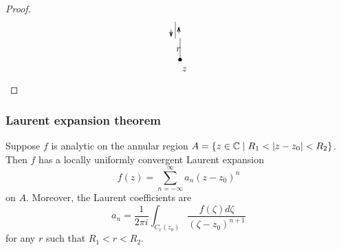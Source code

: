 \documentclass[12pt]{article}
\begin{document}
\begin{proof}
\[\begin{tikzpicture}[x=0.75pt,y=0.75pt,yscale=-.6,xscale=.6]
        \draw    (263.02,62.83) -- (263.02,113.43) ;
        \draw [shift={(263.02,113.43)}, rotate = 90] [color={rgb, 255:red, 0; green, 0; blue, 0 }  ][fill={rgb, 255:red, 0; green, 0; blue, 0 }  ][line width=0.75]      (0, 0) circle [x radius= 3.35, y radius= 3.35]   ;
        \draw    (252,25) -- (252,64.26) ;
        \draw    (242,42.64) -- (242,57.64) ;
        \draw [shift={(242,59.64)}, rotate = 270] [color={rgb, 255:red, 0; green, 0; blue, 0 }  ][line width=0.75]    (10.93,-3.29) .. controls (6.95,-1.4) and (3.31,-0.3) .. (0,0) .. controls (3.31,0.3) and (6.95,1.4) .. (10.93,3.29)   ;
        \draw    (260,52.64) -- (260,39.64) ;
        \draw [shift={(260,37.64)}, rotate = 90] [color={rgb, 255:red, 0; green, 0; blue, 0 }  ][line width=0.75]    (10.93,-3.29) .. controls (6.95,-1.4) and (3.31,-0.3) .. (0,0) .. controls (3.31,0.3) and (6.95,1.4) .. (10.93,3.29)   ;
        
        \draw (265.21,129.09) node [anchor=north west][inner sep=0.75pt]    {$z$};
        \draw (251.95,82.47) node [anchor=north west][inner sep=0.75pt]    {$r$};
        
        
        \end{tikzpicture}
        \]
\end{proof}

\subsubsection{Laurent expansion theorem}
 Suppose $f$ is analytic on the annular region $A=\{z\in \C\mid R_1<|z-z_0|<R_2\}$. Then $f$ has a locally uniformly convergent Laurent expansion $$
f(z)=\sum_{n=-\infty}^{\infty} a_n\left(z-z_0\right)^n
$$
on $A$. Moreover, the Laurent coefficients are
$$
a_n=\frac{1}{2 \pi i} \int_{C_r\left(z_0\right)} \frac{f(\zeta) d \zeta}{\left(\zeta-z_0\right)^{n+1}}
$$
for any $r$ such that $R_1<r<R_2$.
\end{document}
